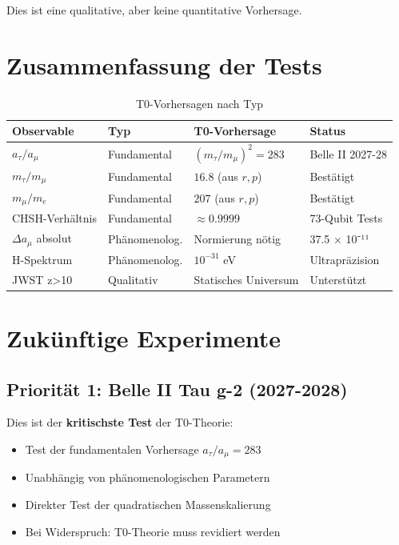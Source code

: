 Dies ist eine qualitative, aber keine quantitative Vorhersage.

\section{Zusammenfassung der Tests}

\begin{table}[h]
	\centering
	\caption{T0-Vorhersagen nach Typ}
	\begin{tabularx}{\textwidth}{|X|X|X|X|}
		\hline
		\textbf{Observable} & \textbf{Typ} & \textbf{T0-Vorhersage} & \textbf{Status} \\
		\hline
		$a_\tau/a_\mu$ & Fundamental & $(m_\tau/m_\mu)^2 = 283$ & Belle II 2027-28 \\
		\hline
		$m_\tau/m_\mu$ & Fundamental & $16.8$ (aus $r,p$) & Bestätigt \checkmark \\
		\hline
		$m_\mu/m_e$ & Fundamental & $207$ (aus $r,p$) & Bestätigt \checkmark \\
		\hline
		CHSH-Verhältnis & Fundamental & $\approx 0.9999$ & 73-Qubit Tests \\
		\hline
		$\Delta a_\mu$ absolut & Phänomenolog. & Normierung nötig & 37.5 × 10⁻¹¹ \\
		\hline
		H-Spektrum & Phänomenolog. & $10^{-31}$ eV & Ultrapräzision \\
		\hline
		JWST z>10 & Qualitativ & Statisches Universum & Unterstützt \\
		\hline
	\end{tabularx}
\end{table}

\section{Zukünftige Experimente}

\subsection{Priorität 1: Belle II Tau g-2 (2027-2028)}

Dies ist der \textbf{kritischste Test} der T0-Theorie:
\begin{itemize}
	\item Test der fundamentalen Vorhersage $a_\tau/a_\mu = 283$
	\item Unabhängig von phänomenologischen Parametern
	\item Direkter Test der quadratischen Massenskalierung
	\item Bei Widerspruch: T0-Theorie muss revidiert werden
\end{itemize}


